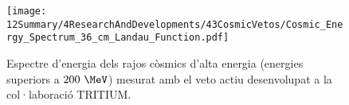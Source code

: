 \begin{enumerate}
\begin{figure}[h]
\texttt{[image: 12Summary/4ResearchAndDevelopments/43CosmicVetos/Cosmic\_Energy\_Spectrum\_36\_cm\_Landau\_Function.pdf]}
\centering
\caption{Espectre d'energia dels rajos còsmics d'alta energia (energies superiors a $200~\MeV$) mesurat amb el veto actiu desenvolupat a la col·laboració TRITIUM\label{fig:EspectreEnergeticVetoActiu}.}
\end{figure}

\end{enumerate}